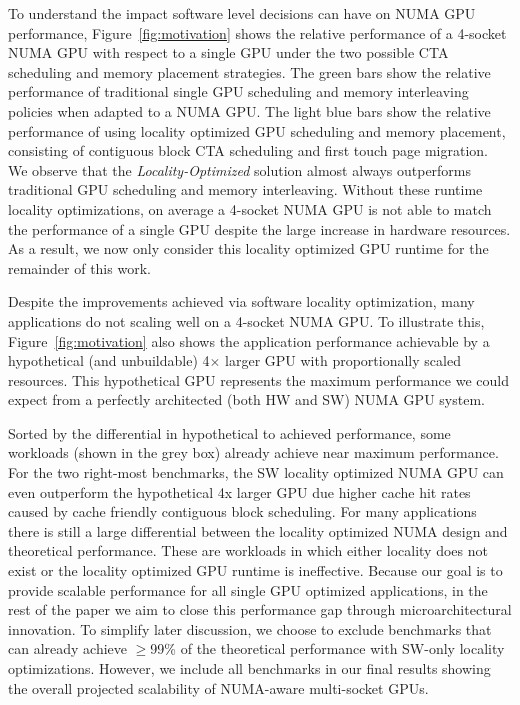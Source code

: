 To understand the impact software level decisions can have on NUMA GPU
performance, Figure~\ref{fig:motivation} shows the relative performance of a 4-socket NUMA 
GPU with respect to a single GPU under the two possible CTA scheduling and 
memory placement strategies.  The green bars show the 
relative performance of traditional single GPU scheduling and memory 
interleaving policies when adapted to a NUMA GPU. The light blue bars
show the relative performance of using locality optimized GPU scheduling and 
memory placement, consisting of contiguous block CTA scheduling and first touch 
page migration. We observe that the \textit{Locality-Optimized} 
solution almost always outperforms traditional GPU scheduling and memory 
interleaving. Without these runtime locality optimizations, on average a 4-socket NUMA 
GPU is not able to match the performance of a single GPU despite the large 
increase in hardware resources. As a result, we now only consider this locality 
optimized GPU runtime for the remainder of this work.

Despite the improvements achieved via software locality optimization, many applications do 
not scaling well on a 4-socket NUMA GPU. To illustrate this, Figure~\ref{fig:motivation} 
also shows the application performance achievable by a hypothetical (and unbuildable)
4$\times$ larger GPU with proportionally scaled resources. This hypothetical GPU
represents the maximum performance we could expect from a perfectly architected 
(both HW and SW) NUMA GPU system. 

Sorted by the differential in hypothetical to achieved performance, some 
workloads (shown in the grey box) already achieve near
maximum performance. For the two right-most 
benchmarks, the SW locality optimized NUMA GPU can even outperform the 
hypothetical 4x larger GPU due higher cache hit rates caused by cache friendly
contiguous block scheduling. For many applications there is still a large differential between the 
locality optimized NUMA design and theoretical performance. These are workloads 
in which either locality does not exist or the locality optimized GPU runtime is 
ineffective. Because our goal is to provide scalable performance for all single GPU 
optimized applications, in the rest of the paper we aim to close this 
performance gap through microarchitectural innovation. To simplify later 
discussion, we choose to exclude benchmarks that can already achieve $\geq$99\% of the 
theoretical performance with SW-only locality optimizations. However, we include 
all benchmarks in our final results showing the overall projected scalability 
of NUMA-aware multi-socket GPUs.
\vspace{-.05in}
